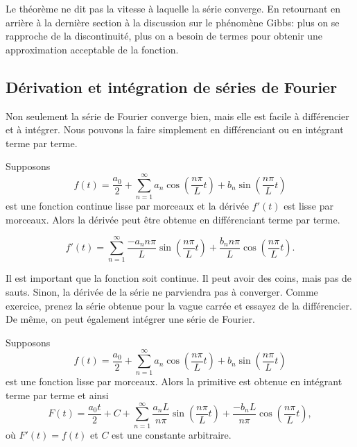 Le théorème ne dit pas la vitesse à laquelle la série converge. En retournant en arrière à la dernière section à la discussion sur le phénomène Gibbs: plus on se rapproche de la discontinuité, plus on a besoin de termes pour obtenir une approximation acceptable de la fonction.  

\subsection{Dérivation et intégration de séries de Fourier}

Non seulement la série de Fourier converge bien, mais elle est facile à différencier
et à intégrer. Nous pouvons la faire simplement en différenciant ou en intégrant terme par terme.

\begin{theorem}
Supposons
\begin{equation*}
f(t) = \frac{a_0}{2} + \sum_{n=1}^\infty a_n \cos \left( \frac{n \pi}{L} t
\right)
+ b_n \sin \left( \frac{n \pi}{L} t \right)
\end{equation*}
est une fonction continue lisse par morceaux et la dérivée $f'(t)$ est  lisse
par morceaux. Alors la dérivée peut être
obtenue en différenciant terme par terme.

\begin{equation*}
f'(t) = \sum_{n=1}^\infty \frac{-a_n n \pi}{L} 
\sin \left( \frac{n \pi}{L} t \right)
+ \frac{b_n n \pi}{L} \cos \left( \frac{n \pi}{L} t \right) .
\end{equation*}
\end{theorem}

Il est important que la fonction soit continue. Il peut avoir des coins, mais pas de
sauts. Sinon, la dérivée de la série ne parviendra pas à converger. Comme 
exercice, prenez la série obtenue pour la vague carrée et essayez de la
différencier. De même, on peut également intégrer une série de Fourier.

\begin{theorem}
Supposons
\begin{equation*}
f(t) = \frac{a_0}{2} + \sum_{n=1}^\infty
a_n \cos \left( \frac{n \pi}{L} t \right)
+ b_n \sin \left( \frac{n \pi}{L} t \right)
\end{equation*}
est une fonction lisse par morceaux. Alors la primitive est
obtenue en intégrant terme par terme et ainsi
\begin{equation*}
F(t) = \frac{a_0 t}{2} + C + \sum_{n=1}^\infty
\frac{a_n L}{n \pi} \sin \left( \frac{n \pi}{L} t \right)
+ \frac{-b_n L}{n \pi}  \cos \left( \frac{n \pi}{L} t \right) ,
\end{equation*}
où  $F'(t) = f(t)$ et $C$ est une constante arbitraire. 
\end{theorem}

